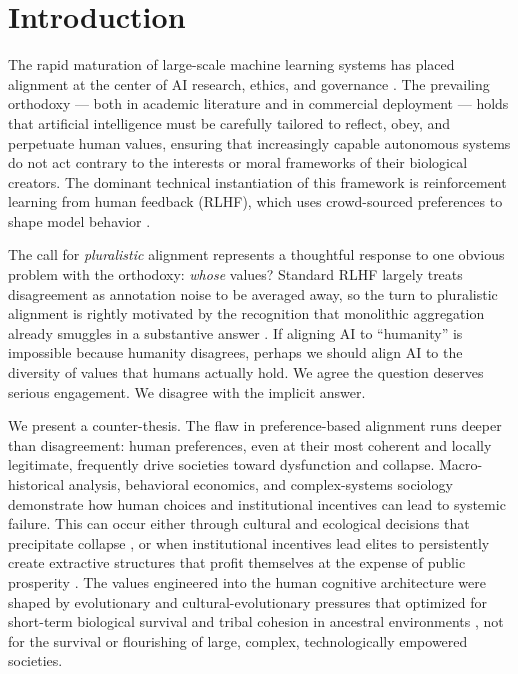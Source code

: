 \documentclass{article}
\theoremstyle{plain}
\theoremstyle{definition}
\theoremstyle{remark}
\begin{document}
\section{Introduction}
\label{sec:intro}

The rapid maturation of large-scale machine learning systems has placed alignment at the center of AI research, ethics, and governance \citep{russell2019human, bostrom2014superintelligence, gabriel2020artificial}. The prevailing orthodoxy --- both in academic literature and in commercial deployment --- holds that artificial intelligence must be carefully tailored to reflect, obey, and perpetuate human values, ensuring that increasingly capable autonomous systems do not act contrary to the interests or moral frameworks of their biological creators. The dominant technical instantiation of this framework is reinforcement learning from human feedback (RLHF), which uses crowd-sourced preferences to shape model behavior \citep{christiano2017deep, ouyang2022training, askell2021general}.

The call for \emph{pluralistic} alignment \citep{sorensen2024roadmap, conitzer2024social} represents a thoughtful response to one obvious problem with the orthodoxy: \emph{whose} values? Standard RLHF largely treats disagreement as annotation noise to be averaged away, so the turn to pluralistic alignment is rightly motivated by the recognition that monolithic aggregation already smuggles in a substantive answer \citep{gabriel2020artificial, sorensen2024roadmap}. If aligning AI to ``humanity'' is impossible because humanity disagrees, perhaps we should align AI to the diversity of values that humans actually hold. We agree the question deserves serious engagement. We disagree with the implicit answer.

We present a counter-thesis. The flaw in preference-based alignment runs deeper than disagreement: human preferences, even at their most coherent and locally legitimate, frequently drive societies toward dysfunction and collapse. Macro-historical analysis, behavioral economics, and complex-systems sociology demonstrate how human choices and institutional incentives can lead to systemic failure. This can occur either through cultural and ecological decisions that precipitate collapse \citep{diamond2011collapse}, or when institutional incentives lead elites to persistently create extractive structures that profit themselves at the expense of public prosperity \citep{acemoglu2012why}. The values engineered into the human cognitive architecture were shaped by evolutionary and cultural-evolutionary pressures that optimized for short-term biological survival and tribal cohesion in ancestral environments \citep{cosmides1992psychological, henrich2020weirdest}, not for the survival or flourishing of large, complex, technologically empowered societies.
\end{document}
